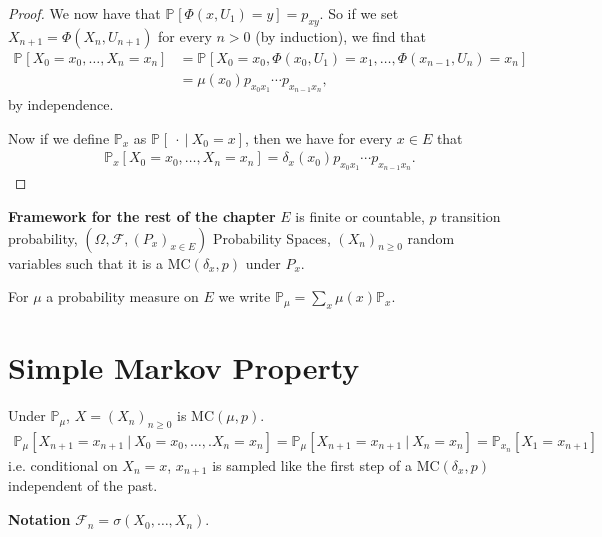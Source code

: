 \begin{proof}
{We now have that $\mathbb{P}_{} \left[\Phi(x,U_1) = y  \right] = p_{xy}$. So if we set $X_{n+1} = \Phi(X_n, U_{n+1})$ for every $n>0$ (by induction), we find that
\begin{align}
	\mathbb{P}_{} \left[ X_0=x_0, \ldots ,X_n=x_n \right] &=
		\mathbb{P}_{} \left[ X_0=x_0, \Phi(x_0, U_1)=x_1 , \ldots , \Phi(x_{n-1}, U_{n}) = x_n \right] \\
	&= \mu(x_0)p_{x_0x_1} \cdots p_{x_{n-1}x_n}
,\end{align}
by independence.

Now if we define $\mathbb{P}_{x} $ as $\mathbb{P}_{} \left[\ \cdot \ | \ X_0 = x \right] $, then we have for every $x \in E$ that
\begin{align}
	\mathbb{P}_{x} \left[ X_0=x_0, \ldots ,X_n=x_n \right] = \delta_x(x_0)p_{x_0x_1} \cdots p_{x_{n-1}x_n}
.\end{align}
}
\end{proof}

\noindent
\textbf{Framework for the rest of the chapter} 
$E$ is finite or countable, $p$ transition probability, $(\Omega, \mathcal{F}, (P_x)_{x \in E})$ Probability Spaces, $(X_n)_{n \geq 0}$ random variables such that it is a  $ \textrm{MC}(\delta_x, p)$ under $P_x$.

For $\mu$ a probability measure on $E $ we write $\mathbb{P}_\mu = \sum_{x}\mu(x)\mathbb{P}_{x}$.

\section{Simple Markov Property}
\begin{rmk}[]
Under $\mathbb{P}_\mu$, $X=(X_n)_{n \geq 0}$ is $ \textrm{MC}(\mu, p)$.
\begin{align}
	\mathbb{P}_\mu [X_{n+1}=x_{n+1} \ | \ X_0 = x_0, \ldots ,.X_n=x_n] = \mathbb{P}_\mu[X_{n+1}=x_{n+1}\ | \ X_n = x_n] = \mathbb{P}_{x_n}[X_1 =x_{n+1}]
\end{align}
i.e. conditional on $X_n=x$, $x_{n+1}$ is sampled like the first step of a $ \textrm{MC}(\delta_{x},p)$ independent of the past.
\end{rmk}
\noindent
\textbf{Notation} $ \mathcal{F}_n = \sigma(X_0, \ldots ,X_n)$.

